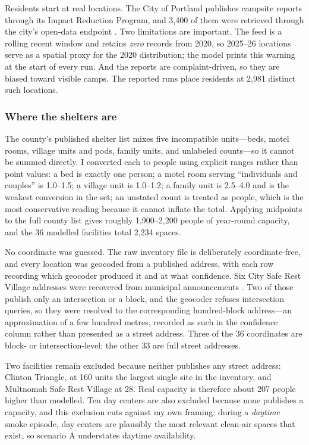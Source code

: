 \documentclass[graybox]{svmult}
\begin{document}
Residents start at real locations. The City of Portland publishes campsite
reports through its Impact Reduction Program, and 3,400 of them were retrieved
through the city's open-data endpoint \cite{portlandirp}. Two limitations are
important. The feed is a rolling recent window and retains \emph{zero} records
from 2020, so 2025--26 locations serve as a spatial proxy for the 2020
distribution; the model prints this warning at the start of every run. And the
reports are complaint-driven, so they are biased toward visible camps. The
reported runs place residents at 2,981 distinct such locations.

\subsubsection{Where the shelters are}
\label{subsec:shelters}

The county's published shelter list \cite{multcoshelters} mixes five
incompatible units---beds, motel rooms, village units and pods, family units,
and unlabeled counts---so it cannot be summed directly. I converted each to
people using explicit ranges rather than point values: a bed is exactly one
person; a motel room serving ``individuals and couples'' is 1.0--1.5; a village
unit is 1.0--1.2; a family unit is 2.5--4.0 and is the weakest conversion in the
set; an unstated count is treated as people, which is the most conservative
reading because it cannot inflate the total. Applying midpoints to the full
county list gives roughly 1,900--2,200 people of year-round capacity, and the 36
modelled facilities total 2,234 spaces.

No coordinate was guessed. The raw inventory file is deliberately
coordinate-free, and every location was geocoded from a published address, with
each row recording which geocoder produced it and at what confidence. Six City
Safe Rest Village addresses were recovered from municipal announcements
\cite{portlandsrv}. Two of those publish only an intersection or a block, and
the geocoder refuses intersection queries, so they were resolved to the
corresponding hundred-block address---an approximation of a few hundred metres,
recorded as such in the confidence column rather than presented as a street
address. Three of the 36 coordinates are block- or intersection-level; the other
33 are full street addresses.

Two facilities remain excluded because neither publishes any street address:
Clinton Triangle, at 160 units the largest single site in the inventory, and
Multnomah Safe Rest Village at 28. Real capacity is therefore about 207 people
higher than modelled. Ten day centers are also excluded because none publishes a
capacity, and this exclusion cuts against my own framing: during a \emph{daytime}
smoke episode, day centers are plausibly the most relevant clean-air spaces that
exist, so scenario A understates daytime availability.
\end{document}
